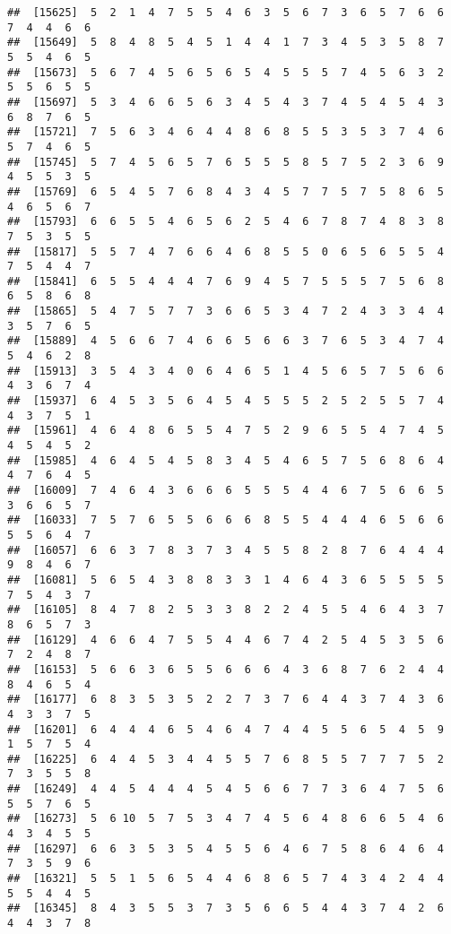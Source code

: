\documentclass[
]{book}
\begin{document}
\begin{verbatim}
##  [15625]  5  2  1  4  7  5  5  4  6  3  5  6  7  3  6  5  7  6  6  7  4  4  6  6
##  [15649]  5  8  4  8  5  4  5  1  4  4  1  7  3  4  5  3  5  8  7  5  5  4  6  5
##  [15673]  5  6  7  4  5  6  5  6  5  4  5  5  5  7  4  5  6  3  2  5  5  6  5  5
##  [15697]  5  3  4  6  6  5  6  3  4  5  4  3  7  4  5  4  5  4  3  6  8  7  6  5
##  [15721]  7  5  6  3  4  6  4  4  8  6  8  5  5  3  5  3  7  4  6  5  7  4  6  5
##  [15745]  5  7  4  5  6  5  7  6  5  5  5  8  5  7  5  2  3  6  9  4  5  5  3  5
##  [15769]  6  5  4  5  7  6  8  4  3  4  5  7  7  5  7  5  8  6  5  4  6  5  6  7
##  [15793]  6  6  5  5  4  6  5  6  2  5  4  6  7  8  7  4  8  3  8  7  5  3  5  5
##  [15817]  5  5  7  4  7  6  6  4  6  8  5  5  0  6  5  6  5  5  4  7  5  4  4  7
##  [15841]  6  5  5  4  4  4  7  6  9  4  5  7  5  5  5  7  5  6  8  6  5  8  6  8
##  [15865]  5  4  7  5  7  7  3  6  6  5  3  4  7  2  4  3  3  4  4  3  5  7  6  5
##  [15889]  4  5  6  6  7  4  6  6  5  6  6  3  7  6  5  3  4  7  4  5  4  6  2  8
##  [15913]  3  5  4  3  4  0  6  4  6  5  1  4  5  6  5  7  5  6  6  4  3  6  7  4
##  [15937]  6  4  5  3  5  6  4  5  4  5  5  5  2  5  2  5  5  7  4  4  3  7  5  1
##  [15961]  4  6  4  8  6  5  5  4  7  5  2  9  6  5  5  4  7  4  5  4  5  4  5  2
##  [15985]  4  6  4  5  4  5  8  3  4  5  4  6  5  7  5  6  8  6  4  4  7  6  4  5
##  [16009]  7  4  6  4  3  6  6  6  5  5  5  4  4  6  7  5  6  6  5  3  6  6  5  7
##  [16033]  7  5  7  6  5  5  6  6  6  8  5  5  4  4  4  6  5  6  6  5  5  6  4  7
##  [16057]  6  6  3  7  8  3  7  3  4  5  5  8  2  8  7  6  4  4  4  9  8  4  6  7
##  [16081]  5  6  5  4  3  8  8  3  3  1  4  6  4  3  6  5  5  5  5  7  5  4  3  7
##  [16105]  8  4  7  8  2  5  3  3  8  2  2  4  5  5  4  6  4  3  7  8  6  5  7  3
##  [16129]  4  6  6  4  7  5  5  4  4  6  7  4  2  5  4  5  3  5  6  7  2  4  8  7
##  [16153]  5  6  6  3  6  5  5  6  6  6  4  3  6  8  7  6  2  4  4  8  4  6  5  4
##  [16177]  6  8  3  5  3  5  2  2  7  3  7  6  4  4  3  7  4  3  6  4  3  3  7  5
##  [16201]  6  4  4  4  6  5  4  6  4  7  4  4  5  5  6  5  4  5  9  1  5  7  5  4
##  [16225]  6  4  4  5  3  4  4  5  5  7  6  8  5  5  7  7  7  5  2  7  3  5  5  8
##  [16249]  4  4  5  4  4  4  5  4  5  6  6  7  7  3  6  4  7  5  6  5  5  7  6  5
##  [16273]  5  6 10  5  7  5  3  4  7  4  5  6  4  8  6  6  5  4  6  4  3  4  5  5
##  [16297]  6  6  3  5  3  5  4  5  5  6  4  6  7  5  8  6  4  6  4  7  3  5  9  6
##  [16321]  5  5  1  5  6  5  4  4  6  8  6  5  7  4  3  4  2  4  4  5  5  4  4  5
##  [16345]  8  4  3  5  5  3  7  3  5  6  6  5  4  4  3  7  4  2  6  4  4  3  7  8

\end{verbatim}
\end{document}
